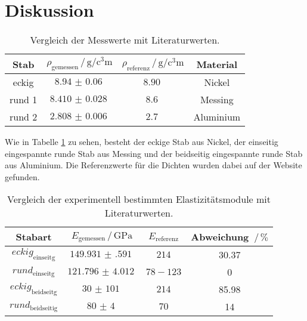 \section{Diskussion}
\label{sec:Diskussion}

\begin{table}
\centering
\caption{Vergleich der Messwerte mit Literaturwerten.}
\begin{tabular}{cccc}
    \toprule
    Stab & $\rho _\text{gemessen} \,/\, \si{\gram\per\cubic\centi\meter}$ & $\rho _\text{referenz} \,/\, \si{\gram\per\cubic\centi\meter}$  & Material \\
    \midrule
    eckig & $\SI{8.94(6)}{}$ & $\SI{8.90}{}$ & Nickel \\
    rund 1 & $\SI{8.410(28)}{}$ & $\SI{8.6}{}$ & Messing \\
    rund 2 & $\SI{2.808(6)}{}$ & $\SI{2.7}{}$& Aluminium \\
    \bottomrule
\end{tabular}
\label{tab:refferenz}
\end{table}

Wie in Tabelle \ref{tab:refferenz} zu sehen, besteht der eckige Stab aus Nickel, der einseitig eingespannte runde Stab aus Messing und der beidseitig eingespannte runde Stab aus Aluminium.
Die Referenzwerte für die Dichten wurden dabei auf der Website \cite{technik} gefunden.

\begin{table}
\centering
\caption{Vergleich der experimentell bestimmten Elastizitätsmodule mit Literaturwerten.}
\begin{tabular}{cccc}
    \toprule
    Stabart & $E_\text{gemessen}\,/\, \si{\giga\pascal}$ & $E_\text{referenz}$ & Abweichung $\,/\, \%$ \\
    \midrule
    $eckig_\text{einseitg}$ & $\SI{149.931(591)}{}$ & $214$ \cite{nickel} & 30.37\\
    $rund_\text{einseitg}$ & $ \SI{121.796(4012)}{}$ & $78-123$ \cite{messing} & 0 \\
    $eckig_\text{beidseitg}$ & $\SI{30(101)}{}$ & $214$ \cite{nickel}& 85.98 \\
    $rund_\text{beidseitig}$ & $\SI{80(4)}{}$ & $70$ \cite{nickel} & 14 \\
\end{tabular}
\label{tab:ele}
\end{table}

